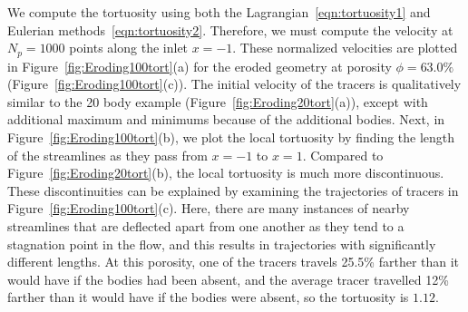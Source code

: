 \documentclass[preprint,10pt]{elsarticle}
\begin{document}
We compute the tortuosity using both the
Lagrangian~\eqref{eqn:tortuosity1} and Eulerian
methods~\eqref{eqn:tortuosity2}. Therefore, we must compute the velocity
at $N_p = 1000$ points along the inlet $x=-1$. These normalized
velocities are plotted in Figure~\ref{fig:Eroding100tort}(a) for the
eroded geometry at porosity $\phi = 63.0\%$
(Figure~\ref{fig:Eroding100tort}(c)).  The initial velocity of the
tracers is qualitatively similar to the 20 body example
(Figure~\ref{fig:Eroding20tort}(a)), except with additional maximum and
minimums because of the additional bodies.  Next, in
Figure~\ref{fig:Eroding100tort}(b), we plot the local tortuosity by
finding the length of the streamlines as they pass from $x=-1$ to $x=1$.
Compared to Figure~\ref{fig:Eroding20tort}(b), the local tortuosity is
much more discontinuous.  These discontinuities can be explained by
examining the trajectories of tracers in
Figure~\ref{fig:Eroding100tort}(c).  Here, there are many instances of
nearby streamlines that are deflected apart from one another as they
tend to a stagnation point in the flow, and this results in trajectories
with significantly different lengths.  At this porosity, one of the
tracers travels 25.5\% farther than it would have if the bodies had been
absent, and the average tracer travelled 12\% farther than it would have
if the bodies were absent, so the tortuosity is $1.12$.
\end{document}
